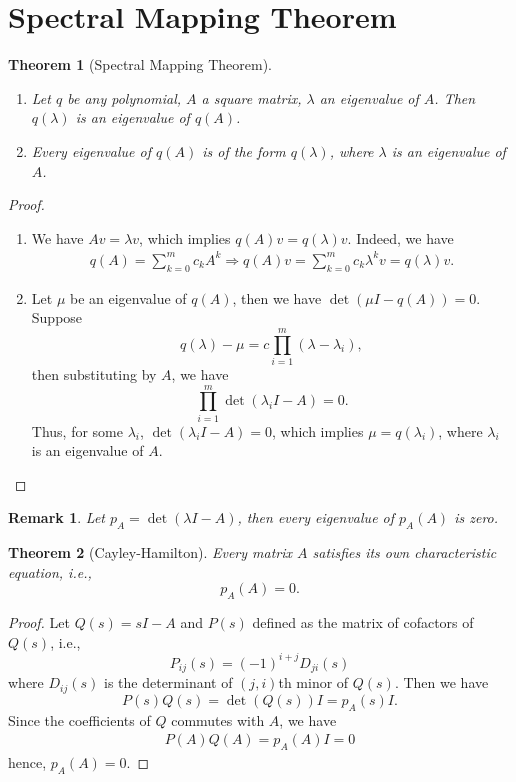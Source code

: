 \documentclass[11pt]{book}
\newtheorem{theorem}{Theorem}[section]
\newtheorem{remark}{Remark}[section]
\theoremstyle{definition}
\numberwithin{equation}{subsection}
\begin{document}
\section{Spectral Mapping Theorem}
\begin{theorem}[Spectral Mapping Theorem]
~\begin{enumerate}[label=(\alph*)]
    \item Let $q$ be any polynomial, $A$ a square matrix, $\lambda$ an eigenvalue of $A$. Then $q(\lambda)$ is an eigenvalue of $q(A)$.
    \item Every eigenvalue of $q(A)$ is of the form $q(\lambda)$, where $\lambda$ is an eigenvalue of $A$.
\end{enumerate}
\end{theorem}
\begin{proof}
~\begin{enumerate}[label=(\alph*)]
    \item We have $Av = \lambda v$, which implies $q(A)v = q(\lambda)v$. Indeed, we have
    \begin{align*}
        q(A) = \sum^m_{k=0} c_k A^k \Rightarrow q(A)v = \sum^m_{k=0} c_k \lambda^k v = q(\lambda)v.
    \end{align*}
    \item Let $\mu$ be an eigenvalue of $q(A)$, then we have $\det (\mu I - q(A)) = 0$. Suppose $$q(\lambda) - \mu = c\prod^m_{i=1}(\lambda - \lambda_i),$$ 
    then substituting by $A$, we have $$\prod^m_{i=1} \det (\lambda_i I - A) = 0.$$
    Thus, for some $\lambda_i$, $\det (\lambda_i I - A) = 0$, which implies $\mu = q(\lambda_i)$, where $\lambda_i$ is an eigenvalue of $A$. 
\end{enumerate}
\end{proof}

\begin{remark}
Let $p_A = \det(\lambda I - A)$, then every eigenvalue of $p_A(A)$ is zero.
\end{remark}

\medskip

\begin{theorem}[Cayley-Hamilton]
Every matrix $A$ satisfies its own characteristic equation, i.e.,
$$p_A(A) = 0.$$
\end{theorem}
\begin{proof}
Let $Q(s) = sI - A$ and $P(s)$ defined as the matrix of cofactors of $Q(s)$, i.e., 
$$P_{ij}(s) = (-1)^{i+j}D_{ji}(s)$$
where $D_{ij}(s)$ is the determinant of $(j,i)$th minor of $Q(s)$. Then we have 
$$P(s)Q(s) = \det (Q(s)) I = p_A(s)I.$$
Since the coefficients of $Q$ commutes with $A$, we have 
\begin{align*}
    P(A)Q(A) = p_A(A)I = 0
\end{align*}
hence, $p_A(A) = 0$.
\end{proof}
\end{document}
